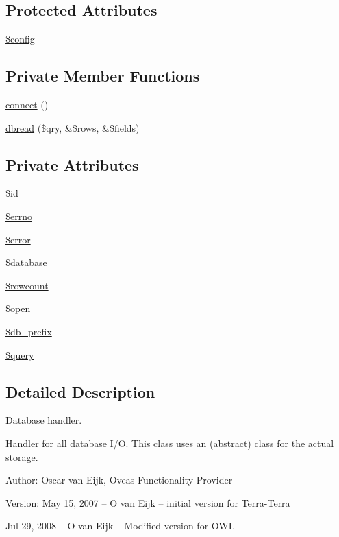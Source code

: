 \subsection*{Protected Attributes}
\begin{CompactItemize}
\item 
\hyperlink{class__OWL_f37a011667dda12fc417a68a6f3077d1}{\$config}
\end{CompactItemize}
\subsection*{Private Member Functions}
\begin{CompactItemize}
\item 
\hyperlink{classDbHandler_9cf52ba614981a0082063d57290d3b7c}{connect} ()
\item 
\hyperlink{classDbHandler_130e49aa639fecb46ce6719ddcb0d72f}{dbread} (\$qry, \&\$rows, \&\$fields)
\end{CompactItemize}
\subsection*{Private Attributes}
\begin{CompactItemize}
\item 
\hyperlink{classDbHandler_d38e1c3312815c8ad4093957881092ff}{\$id}
\item 
\hyperlink{classDbHandler_f6e9f493be56617cb533763bb2a0e85a}{\$errno}
\item 
\hyperlink{classDbHandler_de79e11156abbfc180864beb5b9df377}{\$error}
\item 
\hyperlink{classDbHandler_faac5248f9ee59786b48a7b51f318940}{\$database}
\item 
\hyperlink{classDbHandler_56a7ae4bd7d842c85f3fe8052aecbfef}{\$rowcount}
\item 
\hyperlink{classDbHandler_e159a609794f8ef7451e2dbb597506e8}{\$open}
\item 
\hyperlink{classDbHandler_19af96598e7f72673fc5da26ad77731b}{\$db\_\-prefix}
\item 
\hyperlink{classDbHandler_d671b5596b37dac6d48a660a07775965}{\$query}
\end{CompactItemize}


\subsection{Detailed Description}
Database handler. 

Handler for all database I/O. This class uses an (abstract) class for the actual storage. \begin{Desc}
\item[Author:]Oscar van Eijk, Oveas Functionality Provider \end{Desc}
\begin{Desc}
\item[Version:]May 15, 2007 -- O van Eijk -- initial version for Terra-Terra 

Jul 29, 2008 -- O van Eijk -- Modified version for OWL \end{Desc}


